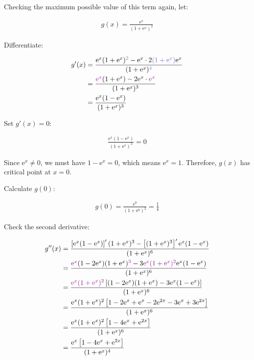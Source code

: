 \documentclass{article}
\begin{document}
Checking the maximum possible value of this term again, let:

\begin{align*}
    g(x) = \frac{\mathrm{e}^{x}}{(1 +\mathrm{e}^{x})^2}
\end{align*}

Differentiate:

\begin{align*}
    g'(x) 
    &= \frac{\mathrm{e}^{x}(1 +\mathrm{e}^{x})\textcolor{Periwinkle}{^2} - \mathrm{e}^{x} \cdot 2\textcolor{Periwinkle}{(1 +\mathrm{e}^{x})}\mathrm{e}^{x}}{(1 +\mathrm{e}^{x})\textcolor{Periwinkle}{^4}} \\
    &= \frac{\textcolor{Plum}{\mathrm{e}^{x}}(1 +\mathrm{e}^{x}) - 2\mathrm{e}^{x} \cdot \textcolor{Plum}{\mathrm{e}^{x}}}{(1 +\mathrm{e}^{x})^3} \\
    &= \frac{\mathrm{e}^{x} (1 - \mathrm{e}^{x})}{(1 +\mathrm{e}^{x})^3} \\
\end{align*}

Set $g'(x) = 0$:

\begin{align*}
    \frac{\mathrm{e}^{x} (1 - \mathrm{e}^{x})}{(1 +\mathrm{e}^{x})^3} = 0
\end{align*}

Since $\mathrm{e}^{x} \ne 0$, we must have $1 - \mathrm{e}^{x} = 0$, which means $\mathrm{e}^{x} = 1$.
Therefore, $g(x)$ has critical point at $x = 0$.
\bigskip

Calculate $g(0)$:

\begin{align*}
    g(0) = \frac{\mathrm{e}^{0}}{(1 +\mathrm{e}^{0})^2} = \frac{1}{4}
\end{align*}

Check the second derivative:

\begin{align*}
    g''(x)
    &= \frac{\left[\mathrm{e}^x(1 - \mathrm{e}^x)\right]'(1 + \mathrm{e}^x)^3 - \left[ (1 + \mathrm{e}^x)^3 \right]'\mathrm{e}^x (1 - \mathrm{e}^x)}{(1 + \mathrm{e}^x)^6} \\
    &= \frac{\textcolor{Plum}{\mathrm{e}^x}(1 - 2 \mathrm{e}^x)(1 + \mathrm{e}^x)\textcolor{Plum}{^3} - 3 \textcolor{Plum}{\mathrm{e}^x (1 + \mathrm{e}^x)^2}\mathrm{e}^x (1 - \mathrm{e}^x)}{(1 + \mathrm{e}^x)^6} \\
    &= \frac{\textcolor{Plum}{\mathrm{e}^x(1 + \mathrm{e}^x)^2} \left[ (1 - 2 \mathrm{e}^x)(1 + \mathrm{e}^x) - 3 \mathrm{e}^x (1 - \mathrm{e}^x) \right]}{(1 + \mathrm{e}^x)^6} \\
    &= \frac{\mathrm{e}^x(1 + \mathrm{e}^x)^2 \left[ 1 - 2 \mathrm{e}^x + \mathrm{e}^x - 2 \mathrm{e}^{2x} - 3 \mathrm{e}^x + 3 \mathrm{e}^{2x} \right]}{(1 + \mathrm{e}^x)^6} \\
    &= \frac{\mathrm{e}^x(1 + \mathrm{e}^x)^2 \left[ 1 - 4\mathrm{e}^x + \mathrm{e}^{2x} \right]}{(1 + \mathrm{e}^x)^6} \\
    &= \frac{\mathrm{e}^x \left[ 1 - 4\mathrm{e}^x + \mathrm{e}^{2x} \right]}{(1 + \mathrm{e}^x)^4} \\
\end{align*}
\end{document}
